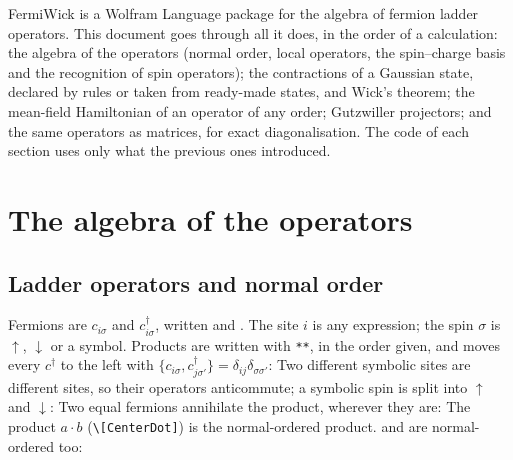 \documentclass[11pt,a4paper]{article}
\begin{document}

\begin{tcolorbox}[colback=accentpale, colframe=accentpale, arc=2pt, left=8pt, right=8pt]
\small FermiWick is a Wolfram Language package for the algebra of fermion ladder operators. This document goes through
all it does, in the order of a calculation: the algebra of the operators (normal order, local operators, the
spin--charge basis and the recognition of spin operators); the contractions of a Gaussian state, declared by rules or
taken from ready-made states, and Wick's theorem; the mean-field Hamiltonian of an operator of any order; Gutzwiller
projectors; and the same operators as matrices, for exact diagonalisation. The code of each section uses only what the
previous ones introduced.
\end{tcolorbox}

{\small\tableofcontents}

\section{The algebra of the operators}

\subsection{Ladder operators and normal order}
Fermions are $c_{i\sigma}$ and $c^\dagger_{i\sigma}$, written  and . The site $i$ is any expression;
the spin $\sigma$ is $\uparrow$, $\downarrow$ or a symbol. Products are written with \texttt{**}, in the order given, and
 moves every $c^\dagger$ to the left with $\{c_{i\sigma},c^\dagger_{j\sigma'}\}=\delta_{ij}\delta_{\sigma\sigma'}$:
Two different symbolic sites are different sites, so their operators anticommute; a symbolic spin is split into $\uparrow$
and $\downarrow$:
Two equal fermions annihilate the product, wherever they are:
The product $a\cdot b$ (\texttt{\textbackslash[CenterDot]}) is the normal-ordered product.  and
 are normal-ordered too:
\end{document}
